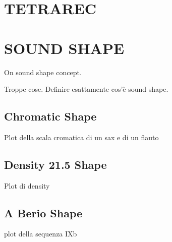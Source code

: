\documentclass{article}
\begin{document}
\section{TETRAREC}
\label{sec:tetrarec}



\section{SOUND SHAPE}
\label{sec:sshape}

On sound shape concept.

Troppe cose. Definire esattamente cos'\`e sound shape.

\subsection{Chromatic Shape}
\label{sec:cshape}

Plot della scala cromatica di un sax e di un flauto

\subsection{Density 21.5 Shape}
\label{sec:dshape}

Plot di density

\subsection{A Berio Shape}
\label{sec:bshape}

plot della sequenza IXb

%
\end{document}
